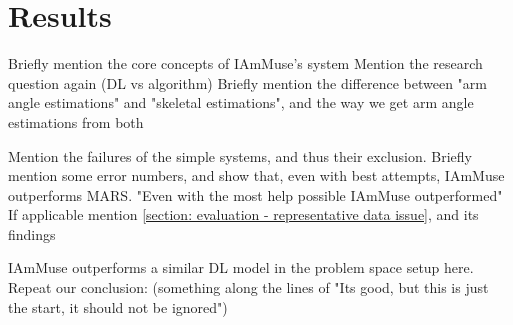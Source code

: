 
\section{Results}
\label{section: conclusion - results}

Briefly mention the core concepts of IAmMuse's system
Mention the research question again (DL vs algorithm)
Briefly mention the difference between "arm angle estimations" and "skeletal estimations", and the way we get arm angle estimations from both

Mention the failures of the simple systems, and thus their exclusion.
Briefly mention some error numbers, and show that, even with best attempts, IAmMuse outperforms MARS.
"Even with the most help possible IAmMuse outperformed"
If applicable mention \cref{section: evaluation - representative data issue}, and its findings

IAmMuse outperforms a similar DL model in the problem space setup here.
Repeat our conclusion: (something along the lines of "Its good, but this is just the start, it should not be ignored")






